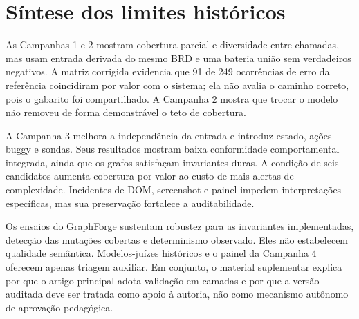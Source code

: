 \documentclass[11pt,a4paper]{article}
\begin{document}
\section{Síntese dos limites históricos}

As Campanhas 1 e 2 mostram cobertura parcial e diversidade entre chamadas, mas usam entrada derivada do mesmo BRD e uma bateria união sem verdadeiros negativos. A matriz corrigida evidencia que 91 de 249 ocorrências de erro da referência coincidiram por valor com o sistema; ela não avalia o caminho correto, pois o gabarito foi compartilhado. A Campanha 2 mostra que trocar o modelo não removeu de forma demonstrável o teto de cobertura.

A Campanha 3 melhora a independência da entrada e introduz estado, ações buggy e sondas. Seus resultados mostram baixa conformidade comportamental integrada, ainda que os grafos satisfaçam invariantes duras. A condição de seis candidatos aumenta cobertura por valor ao custo de mais alertas de complexidade. Incidentes de DOM, screenshot e painel impedem interpretações específicas, mas sua preservação fortalece a auditabilidade.

Os ensaios do GraphForge sustentam robustez para as invariantes implementadas, detecção das mutações cobertas e determinismo observado. Eles não estabelecem qualidade semântica. Modelos-juízes históricos e o painel da Campanha 4 oferecem apenas triagem auxiliar. Em conjunto, o material suplementar explica por que o artigo principal adota validação em camadas e por que a versão auditada deve ser tratada como apoio à autoria, não como mecanismo autônomo de aprovação pedagógica.
\end{document}
